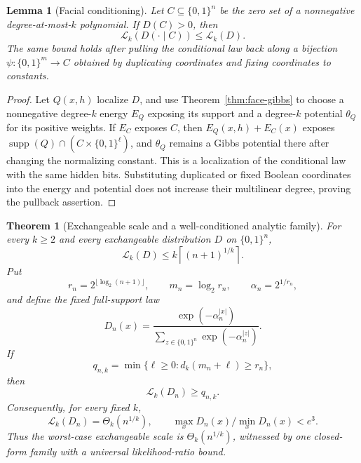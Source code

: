 \documentclass{article}
\newcommand{\LC}{\mathcal{L}}
\newcommand{\supp}{\operatorname{supp}}
\newcommand{\bits}{\{0,1\}}
\newtheorem{theorem}{Theorem}
\newtheorem{lemma}{Lemma}
\begin{document}
\begin{lemma}[Facial conditioning]
\label{lem:facial-conditioning}
Let $C\subseteq\bits^n$ be the zero set of a nonnegative degree-at-most-$k$
polynomial.  If $D(C)>0$, then
\[
  \LC_k(D(\mathord\cdot\mid C))\le \LC_k(D).
\]
The same bound holds after pulling the conditional law back along a bijection
$\psi:\bits^m\to C$ obtained by duplicating coordinates and fixing
coordinates to constants.
\end{lemma}

\begin{proof}
Let $Q(x,h)$ localize $D$, and use Theorem~\ref{thm:face-gibbs} to choose a
nonnegative degree-$k$ energy $E_Q$ exposing its support and a degree-$k$
potential $\theta_Q$ for its positive weights.  If $E_C$ exposes $C$, then
$E_Q(x,h)+E_C(x)$ exposes
$\supp(Q)\cap(C\times\bits^\ell)$, and $\theta_Q$ remains a Gibbs potential
there after changing the normalizing constant.  This is a localization of the
conditional law with the same hidden bits.  Substituting duplicated or fixed
Boolean coordinates into the energy and potential does not increase their
multilinear degree, proving the pullback assertion.
\end{proof}

\begin{theorem}[Exchangeable scale and a well-conditioned analytic family]
\label{thm:exchangeable-window}
For every $k\ge2$ and every exchangeable distribution $D$ on $\bits^n$,
\[
  \LC_k(D)
  \le k\left\lceil(n+1)^{1/k}\right\rceil.
  \tag{1}
\]
Put
\[
  r_n=2^{\lfloor\log_2(n+1)\rfloor},
  \qquad m_n=\log_2 r_n,
  \qquad \alpha_n=2^{1/r_n},
\]
and define the fixed full-support law
\[
  D_n(x)=
  \frac{\exp(-\alpha_n^{|x|})}
       {\sum_{z\in\bits^n}\exp(-\alpha_n^{|z|})}.
  \tag{2}
\]
If
\[
  q_{n,k}=\min\{\ell\ge0:d_k(m_n+\ell)\ge r_n\},
\]
then
\[
  \LC_k(D_n)\ge q_{n,k}.
  \tag{3}
\]
Consequently, for every fixed $k$,
\[
  \LC_k(D_n)=\Theta_k(n^{1/k}),
  \qquad
  \max_xD_n(x)/\min_xD_n(x)<e^3.
  \tag{4}
\]
Thus the worst-case exchangeable scale is $\Theta_k(n^{1/k})$, witnessed by
one closed-form family with a universal likelihood-ratio bound.
\end{theorem}
\end{document}
